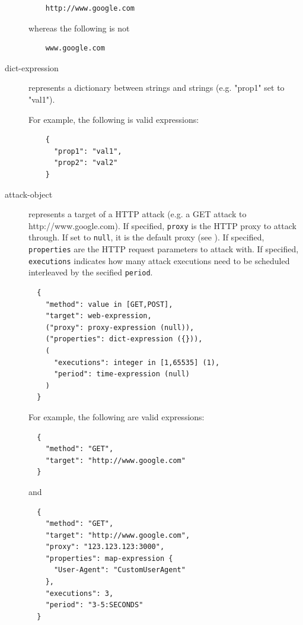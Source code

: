 \begin{description}
  \begin{verbatim}
    http://www.google.com
  \end{verbatim}

  whereas the following is not

  \begin{verbatim}
    www.google.com
  \end{verbatim}

  \item[dict-expression] represents a dictionary between strings and strings (e.g. "prop1" set to "val1").

  For example, the following is valid expressions:

  \begin{verbatim}
    {
      "prop1": "val1",
      "prop2": "val2"
    }
  \end{verbatim}

  \item[attack-object] represents a target of a HTTP attack (e.g. a GET attack to http://www.google.com).
  If specified, \texttt{proxy} is the HTTP proxy to attack through. If set to \texttt{null}, it is the default proxy (see ).
  If specified, \texttt{properties} are the HTTP request parameters to attack with.
  If specified, \texttt{executions} indicates how many attack executions need to be scheduled interleaved by the secified \texttt{period}.

  \begin{verbatim}
  {
    "method": value in [GET,POST],
    "target": web-expression,
    ("proxy": proxy-expression (null)),
    ("properties": dict-expression ({})),
    (
      "executions": integer in [1,65535] (1),
      "period": time-expression (null)
    )
  }
  \end{verbatim}

  For example, the following are valid expressions:

  \begin{verbatim}
  {
    "method": "GET",
    "target": "http://www.google.com"
  }
  \end{verbatim}

  and

  \begin{verbatim}
  {
    "method": "GET",
    "target": "http://www.google.com",
    "proxy": "123.123.123:3000",
    "properties": map-expression {
      "User-Agent": "CustomUserAgent"
    },
    "executions": 3,
    "period": "3-5:SECONDS"
  }
  \end{verbatim}

\end{description}

